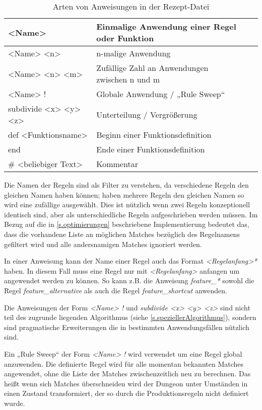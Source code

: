 \begin{table}[h]
    \begin{tabular}{@{}llll@{}}
        \toprule
        <Name> & Einmalige Anwendung einer Regel oder Funktion \\ \midrule
        <Name> <n> & n-malige Anwendung \\ \midrule
        <Name> <n> <m> & Zufällige Zahl an Anwendungen zwischen n und m \\ \midrule
        <Name> ! & Globale Anwendung / „Rule Sweep“ \\ \midrule
        subdivide <x> <y> <z> & Unterteilung / Vergrößerung \\ \midrule
        def <Funktionsname> & Beginn einer Funktionsdefinition \\ \midrule
        end & Ende einer Funktionsdefinition \\ \midrule
        \# <beliebiger Text> & Kommentar \\ \bottomrule
    \end{tabular}
    \caption{Arten von Anweisungen in der Rezept-Datei}
    \label{t.anweisungen}
\end{table}

Die Namen der Regeln sind als Filter zu verstehen, da verschiedene Regeln den gleichen Namen haben können; haben mehrere Regeln den gleichen Namen so wird eine zufällige ausgewählt. Dies ist nützlich wenn zwei Regeln konzeptionell identisch sind, aber als unterschiedliche Regeln aufgeschrieben werden müssen. Im Bezug auf die in \ref{s.optimierungen} beschriebene Implementierung bedeutet das, dass die vorhandene Liste an möglichen Matches bezüglich des Regelnamens gefiltert wird und alle andersnamigen Matches ignoriert werden. 

In einer Anweisung kann der Name einer Regel auch das Format \textit{<Regelanfang>*} haben. In diesem Fall muss eine Regel nur mit \textit{<Regelanfang>} anfangen um angewendet werden zu können. So kann z.B. die Anweisung \textit{feature\_*} sowohl die Regel \textit{feature\_alternative} als auch die Regel \textit{feature\_shortcut} anwenden.

Die Anweisungen der Form \textit{<Name> !} und \textit{subdivide <x> <y> <z>} sind nicht teil des zugrunde liegenden Algorithmus (siehe \ref{s.speziellerAlgorithmus}), sondern sind pragmatische Erweiterungen die in bestimmten Anwendungsfällen nützlich sind.

Ein „Rule Sweep“ der Form \textit{<Name> !} wird verwendet um eine Regel global anzuwenden. Die definierte Regel wird für alle momentan bekannten Matches angewendet, ohne die Liste der Matches zwischenzeitlich neu zu berechnen. Das heißt wenn sich Matches überschneiden wird der Dungeon unter Umständen in einen Zustand transformiert, der so durch die Produktionsregeln nicht definiert wurde. 

